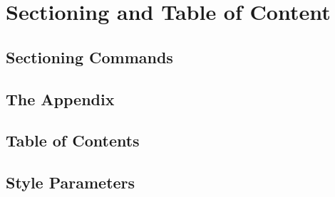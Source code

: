 \section{Sectioning and Table of Content}
\subsection{Sectioning Commands}


\subsection{The Appendix}


\subsection{Table of Contents}


\subsection{Style Parameters}
\newpage